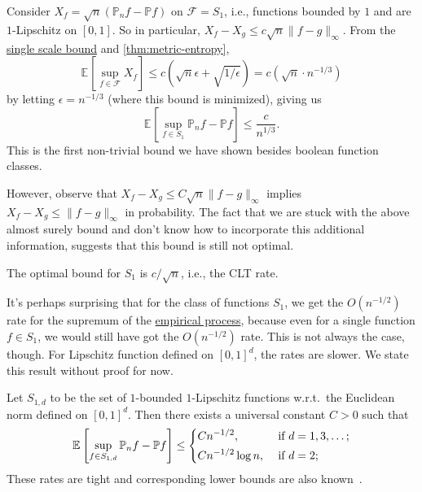 \begin{eg}\label{eg:non-optimal-empirical-process-supremum-S1}
	Consider \(X_f = \sqrt{n} (\mathbb{P} _n f - \mathbb{P} f)\) on \(\mathscr{F} = S_1\), i.e., functions bounded by \(1\) and are \(1\)-Lipschitz on \([0, 1]\). So in particular, \(X_f - X_g \leq c \sqrt{n} \lVert f - g \rVert _\infty\). From the \hyperref[lma:single-scale-bound]{single scale bound} and \autoref{thm:metric-entropy},
	\[
		\mathbb{E}_{}\left[\sup _{f\in \mathscr{F} } X_f \right]
		\leq c \left(\sqrt{n} \epsilon + \sqrt{1 / \epsilon } \right)
		= c(\sqrt{n} \cdot n^{-1 / 3})
	\]
	by letting \(\epsilon = n^{-1 / 3}\) (where this bound is minimized), giving us
	\[
		\mathbb{E}_{}\left[\sup _{f\in S_1}\mathbb{P} _n f - \mathbb{P} f \right] \leq \frac{c}{n^{1 / 3}}.
	\]
	This is the first non-trivial bound we have shown besides boolean function classes.

	However, observe that \(X_f - X_g \leq C \sqrt{n} \lVert f - g \rVert _\infty \) implies \(X_f - X_g \leq \lVert f - g \rVert _\infty \) in probability. The fact that we are stuck with the above almost surely bound and don't know how to incorporate this additional information, suggests that this bound is still not optimal.
	\begin{remark}
		The optimal bound for \(S_1\) is \(c / \sqrt{n} \), i.e., the CLT rate.
	\end{remark}
\end{eg}

It's perhaps surprising that for the class of functions \(S_1\), we get the \(O(n^{-1 / 2})\) rate for the supremum of the \hyperref[def:EP]{empirical process}, because even for a single function \(f\in S_1\), we would still have got the \(O(n^{-1 / 2})\) rate. This is not always the case, though. For Lipschitz function defined on \([0, 1]^d\), the rates are slower. We state this result without proof for now.

\begin{lemma}
	Let \(S_{1, d}\) to be the set of \(1\)-bounded \(1\)-Lipschitz functions w.r.t.\ the Euclidean norm defined on \([0, 1]^d\). Then there exists a universal constant \(C > 0\) such that
	\[
		\mathbb{E}_{}\left[\sup _{f\in S_{1, d}} \mathbb{P} _n f - \mathbb{P} f\right]
		\leq \begin{dcases}
			C n^{-1 / 2},       & \text{ if } d = 1 , 3, \dots ; \\
			Cn^{-1 / 2} \log n, & \text{ if } d = 2 ;            \\
		\end{dcases}
	\]
	These rates are tight and corresponding lower bounds are also known~\cite[Problem 5.11 (d)]{noauthororeditor}.
\end{lemma}